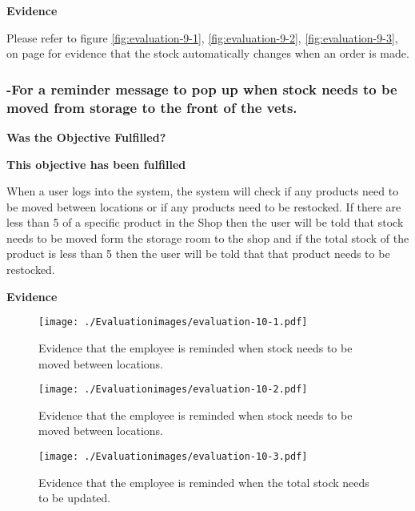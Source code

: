 \textbf{Evidence} \newline

Please refer to figure \ref{fig:evaluation-9-1}, \ref{fig:evaluation-9-2}, \ref{fig:evaluation-9-3}, on  page \pageref{automatic-stock-evidence} for evidence that the stock automatically changes when an order is made.



\pagebreak
\subsubsection{-For a reminder message to pop up when stock needs to be moved from storage to the front of the vets. }
\textbf{Was the Objective Fulfilled?} \newline

\textbf{\large{This objective has been fulfilled}}

When a user logs into the system, the system will check if any products need to be moved between locations or if any products need to be restocked. If there are less than 5 of a specific product in the Shop then the user will be told that stock needs to be moved form the storage room to the shop and if the total stock of the product is less than 5 then the user will be told that that product needs to be restocked.\newline

\textbf{Evidence} \newline

\begin{figure}[H]
\caption{Evidence that the employee is reminded when stock needs to be moved between locations.} \label{fig:evaluation-10-1}
\hfill\texttt{[image: ./Evaluationimages/evaluation-10-1.pdf]}
\end{figure}

\begin{figure}[H]
\caption{Evidence that the employee is reminded when stock needs to be moved between locations.} \label{fig:evaluation-10-2}
\hfill\texttt{[image: ./Evaluationimages/evaluation-10-2.pdf]}
\end{figure}

\begin{figure}[H]
\caption{Evidence that the employee is reminded when the total stock needs to be updated.} \label{fig:evaluation-10-3}
\hfill\texttt{[image: ./Evaluationimages/evaluation-10-3.pdf]}
\end{figure}

